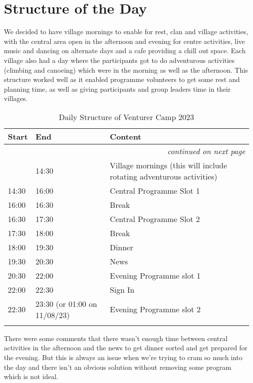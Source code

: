 \chapter{Structure of the Day}
We decided to have village mornings to enable for rest, clan and village activities, with the central area open in the afternoon and evening for centre activities, live music and dancing on alternate days and a cafe providing a chill out space. Each village also had a day where the participants got to do adventurous activities (climbing and canoeing) which were in the morning as well as the afternoon. This structure worked well as it enabled programme volunteers to get some rest and planning time, as well as giving participants and group leaders time in their villages.

{\RaggedRight \centering
\begin{longtable}{p{} p{} p{}}
\textbf{Start} & \textbf{End} & \textbf{Content} \\ 
\hline
\endhead

\multicolumn{3}{r}{\footnotesize\itshape continued on next page}\\
\endfoot 

\endlastfoot

& 14:30 & Village mornings (this will include rotating adventurous activities) \\ 
\hline
14:30 & 16:00 & Central Programme Slot 1 \\ 
\hline
16:00 & 16:30 & Break \\ 
\hline
16:30 & 17:30 & Central Programme Slot 2 \\ 
\hline
17:30 & 18:00 & Break \\ 
\hline
18:00 & 19:30 & Dinner \\ 
\hline
19:30 & 20:30 & News \\ 
\hline
20:30 & 22:00 & Evening Programme slot 1 \\ 
\hline
22:00 & 22:30 & Sign In \\ 
\hline
22:30 & 23:30 \newline (or 01:00 on 11/08/23) & Evening Programme slot 2 \\ 
\hline

\caption{Daily Structure of Venturer Camp 2023}
\end{longtable}
}%

There were some comments that there wasn't enough time between central activities in the afternoon and the news to get dinner sorted and get prepared for the evening. But this is always an issue when we're trying to cram so much into the day and there isn't an obvious solution without removing some program which is not ideal. 


